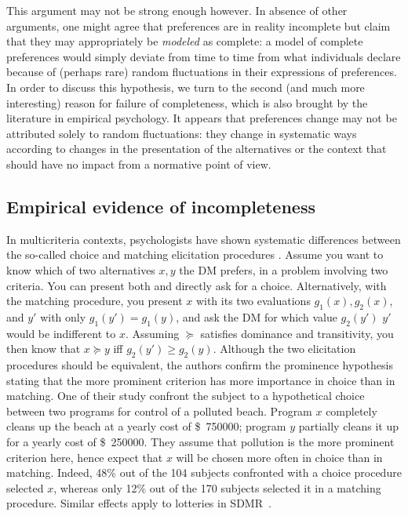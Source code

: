 \documentclass[french, english]{llncs}
\newcommand{\dollars}[1]{\SI{#1}[\$]{}}
\begin{document}
This argument may not be strong enough however. In absence of other arguments, one might agree that preferences are in reality incomplete but claim that they may appropriately be \emph{modeled} as complete: a model of complete preferences would simply deviate from time to time from what individuals declare because of (perhaps rare) random fluctuations in their expressions of preferences. 
In order to discuss this hypothesis, we turn to the second (and much more interesting) reason for failure of completeness, which is also brought by the literature in empirical psychology. It appears that preferences change may not be attributed solely to random fluctuations: they change in systematic ways according to changes in the presentation of the alternatives or the context that should have no impact from a normative point of view.
	
\subsection{Empirical evidence of incompleteness}
\label{sec:evidence}
In multicriteria contexts, psychologists have shown systematic differences between the so-called choice and matching elicitation procedures \citep{tversky_contingent_1988}. Assume you want to know which of two alternatives $x, y$ the \ac{DM} prefers, in a problem involving two criteria. You can present both and directly ask for a choice. Alternatively, with the matching procedure, you present $x$ with its two evaluations $g_1(x), g_2(x)$, and $y'$ with only $g_1(y') = g_1(y)$, and ask the \ac{DM} for which value $g_2(y')$ $y'$ would be indifferent to $x$. Assuming $\succeq$ satisfies dominance and transitivity, you then know that $x \succeq y$ iff $g_2(y') ≥ g_2(y)$. Although the two elicitation procedures should be equivalent, the authors confirm the prominence hypothesis stating that the more prominent criterion has more importance in choice than in matching. One of their study confront the subject to a hypothetical choice between two programs for control of a polluted beach. Program $x$ completely cleans up the beach at a yearly cost of \dollars{750 000}; program $y$ partially cleans it up for a yearly cost of \dollars{250 000}. They assume that pollution is the more prominent criterion here, hence expect that $x$ will be chosen more often in choice than in matching. Indeed, 48\% out of the 104 subjects confronted with a choice procedure selected $x$, whereas only 12\% out of the 170 subjects selected it in a matching procedure. Similar effects apply to lotteries in SDMR~\citep{luce_utility_2000}.
	
\end{document}
